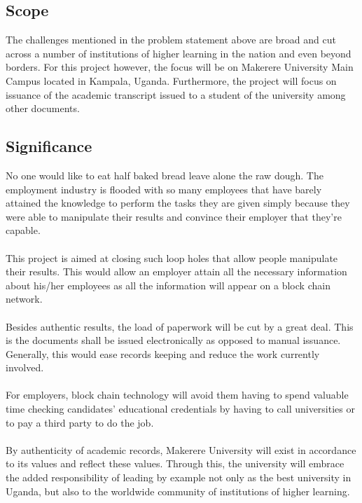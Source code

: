 \subsection{Scope}

The challenges mentioned in the problem statement above are broad and cut across a number of institutions of higher learning in the nation and even beyond borders. For this project however, the focus will be on Makerere University Main Campus located in Kampala, Uganda. Furthermore, the project will focus on issuance of the academic transcript issued to a student of the university among other documents.

\subsection{Significance}

No one would like to eat half baked bread leave alone the raw dough. The employment industry is flooded with so many employees that have barely attained the knowledge to perform the tasks they are given simply because they were able to manipulate their results and convince their employer that they’re capable. \\ \\
This project is aimed at closing such loop holes that allow people manipulate their results. This would allow an employer attain all the necessary information about his/her employees as all the information will appear on a block chain network. \\ \\
Besides authentic results, the load of paperwork will be cut by a great deal. This is the documents shall be issued electronically as opposed to manual issuance. Generally, this would ease records keeping and reduce the work currently involved. \\ \\
For employers, block chain technology will avoid them having to spend valuable time checking candidates' educational credentials by having to call universities or to pay a third party to do the job. \\ \\
By authenticity of academic records, Makerere University will exist in accordance to its values and reflect these values. Through this, the university will embrace the added responsibility of leading by example not only as the best university in Uganda, but also to the worldwide community of institutions of higher learning. \\ 
